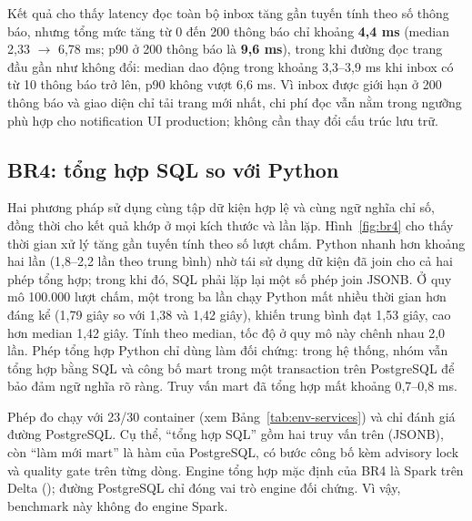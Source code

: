 Kết quả cho thấy latency đọc toàn bộ inbox tăng gần tuyến tính theo số thông báo, nhưng tổng mức tăng từ 0 đến 200 thông báo chỉ khoảng \textbf{4,4 ms} (median 2,33 $\rightarrow$ 6,78 ms; p90 ở 200 thông báo là \textbf{9,6 ms}), trong khi đường đọc trang đầu gần như không đổi: median dao động trong khoảng 3,3--3,9 ms khi inbox có từ 10 thông báo trở lên, p90 không vượt 6,6 ms. Vì inbox được giới hạn ở 200 thông báo và giao diện chỉ tải trang mới nhất, chi phí đọc vẫn nằm trong ngưỡng phù hợp cho notification UI production; không cần thay đổi cấu trúc lưu trữ.

\subsection{BR4: tổng hợp SQL so với Python}

Hai phương pháp sử dụng cùng tập dữ kiện hợp lệ và cùng ngữ nghĩa chỉ số, đồng thời cho kết quả khớp ở mọi kích thước và lần lặp. Hình~\ref{fig:br4} cho thấy thời gian xử lý tăng gần tuyến tính theo số lượt chấm. Python nhanh hơn khoảng hai lần (1,8--2,2 lần theo trung bình) nhờ tái sử dụng dữ kiện đã join cho cả hai phép tổng hợp; trong khi đó, SQL phải lặp lại một số phép join JSONB. Ở quy mô 100.000 lượt chấm, một trong ba lần chạy Python mất nhiều thời gian hơn đáng kể (1,79 giây so với 1,38 và 1,42 giây), khiến trung bình đạt 1,53 giây, cao hơn median 1,42 giây. Tính theo median, tốc độ ở quy mô này chênh nhau 2,0 lần. Phép tổng hợp Python chỉ dùng làm đối chứng: trong hệ thống, nhóm vẫn tổng hợp bằng SQL và công bố mart trong một transaction trên PostgreSQL để bảo đảm ngữ nghĩa rõ ràng. Truy vấn mart đã tổng hợp mất khoảng 0,7--0,8 ms.

Phép đo chạy với 23/30 container (xem Bảng~\ref{tab:env-services}) và chỉ đánh giá đường PostgreSQL. Cụ thể, ``tổng hợp SQL'' gồm hai truy vấn trên  (JSONB), còn ``làm mới mart'' là hàm  của PostgreSQL, có bước công bố kèm advisory lock và quality gate trên từng dòng. Engine tổng hợp mặc định của BR4 là Spark trên Delta (); đường PostgreSQL chỉ đóng vai trò engine đối chứng. Vì vậy, benchmark này không đo engine Spark.

